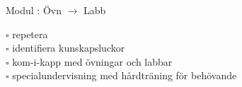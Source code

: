 
Modul : Övn  $\rightarrow$ Labb 
\begin{multicols}{3}\SlideFontTiny
$\square$ repetera \\
$\square$ identifiera kunskapsluckor \\
$\square$ kom-i-kapp med övningar och labbar \\
$\square$ specialundervisning med hårdträning för behövande \\     
\end{multicols}
